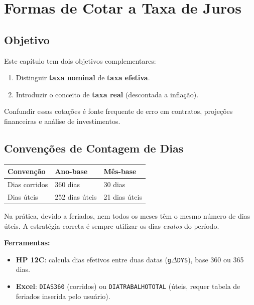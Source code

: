 
\chapter{Formas de Cotar a Taxa de Juros}

\section{Objetivo}

Este capítulo tem dois objetivos complementares:
\begin{enumerate}[label=\textbf{\arabic*.}]
  \item Distinguir \textbf{taxa nominal} de \textbf{taxa efetiva}.
  \item Introduzir o conceito de \textbf{taxa real} (descontada a inflação).
\end{enumerate}

Confundir essas cotações é fonte frequente de erro em contratos, projeções financeiras e análise de investimentos.

\section{Convenções de Contagem de Dias}

\begin{center}
\renewcommand{\arraystretch}{1.3}
\begin{tabular}{lll}
\toprule
\textbf{Convenção} & \textbf{Ano-base} & \textbf{Mês-base} \\
\midrule
Dias corridos & 360 dias & 30 dias \\
Dias úteis    & 252 dias úteis & 21 dias úteis \\
\bottomrule
\end{tabular}
\end{center}

\begin{nota}
Na prática, devido a feriados, nem todos os meses têm o mesmo número de dias úteis.
A estratégia correta é sempre utilizar os dias \emph{exatos} do período.

\smallskip
\textbf{Ferramentas:}
\begin{itemize}[leftmargin=1.5em, nosep]
  \item \textbf{HP 12C}: calcula dias efetivos entre duas datas (\texttt{g\;$\Delta$DYS}),
        base 360 ou 365 dias.
  \item \textbf{Excel}: \texttt{DIAS360} (corridos) ou \texttt{DIATRABALHOTOTAL}
        (úteis, requer tabela de feriados inserida pelo usuário).
\end{itemize}
\end{nota}

